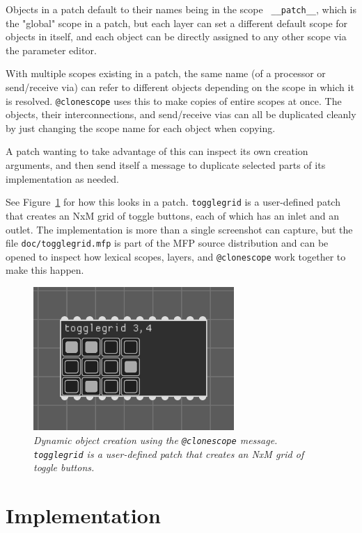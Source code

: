 \documentclass[a4paper]{article}
\begin{document}
Objects in a patch default to their names being in the scope {\tt
\_\_patch\_\_}, which is the "global" scope in a patch, but each
layer can set a different default scope for objects in itself,
and each object can be directly assigned to any other scope via
the parameter editor.

With multiple scopes existing in a patch, the same name (of a
processor or send/receive via) can refer to different objects
depending on the scope in which it is resolved. {\tt @clonescope}
uses this to make copies of entire scopes at once. The objects,
their interconnections, and send/receive vias can all be
duplicated cleanly by just changing the scope name for each
object when copying.

A patch wanting to take advantage of this can inspect its own
creation arguments, and then send itself a message to duplicate
selected parts of its implementation as needed.

See Figure~\ref{fig:clonescope} for how this looks in a patch.
{\tt togglegrid} is a user-defined patch that creates an NxM grid
of toggle buttons, each of which has an inlet and an outlet.
The implementation is more than a single screenshot can capture,
but the file {\tt doc/togglegrid.mfp} is part of the MFP source
distribution and can be opened to inspect how lexical scopes,
layers, and {\tt @clonescope} work together to make this happen.

\begin{figure}[ht]
\centerline{\includegraphics[width=3in]{togglegrid.png}}
\caption{\label{fig:clonescope}{
    \it Dynamic object creation using the {\tt @clonescope} message.
    {\tt togglegrid} is a user-defined patch that creates an NxM
    grid of toggle buttons.
}}
\end{figure}


\section{Implementation}
\end{document}
